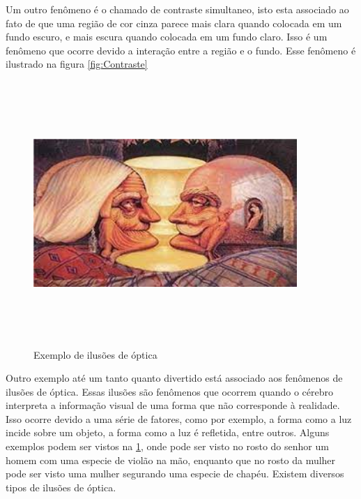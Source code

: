 \documentclass[12pt]{article}
\begin{document}
    Um outro fenômeno é o chamado de contraste simultaneo, isto esta associado ao fato de que uma região de cor cinza parece mais clara
    quando colocada em um fundo escuro, e mais escura quando colocada em um fundo claro. Isso é um fenômeno que ocorre devido a interação
    entre a região e o fundo. Esse fenômeno é ilustrado na figura \ref{fig:Contraste}

    \begin{figure}[H]
        \centering
        \includegraphics[width=10cm,height=10cm]{images/13.png}
        \caption{Exemplo de ilusões de óptica}
        \label{fig:ilusao}
    \end{figure}
    Outro exemplo até um tanto quanto divertido está associado aos fenômenos de ilusões de óptica.
    Essas ilusões são fenômenos que ocorrem quando o cérebro interpreta a informação visual de uma forma
    que não corresponde à realidade. Isso ocorre devido a uma série de fatores, como por exemplo, a
    forma como a luz incide sobre um objeto, a forma como a luz é refletida, entre outros.
    Alguns exemplos podem ser vistos na \ref{fig:ilusao}, onde pode ser visto no rosto do senhor
    um homem com uma especie de violão na mão, enquanto que no rosto da mulher pode ser visto uma mulher
    segurando uma especie de chapéu. Existem diversos tipos de ilusões de óptica.
\end{document}

